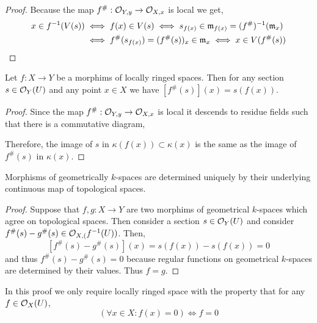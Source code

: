 \documentclass[12pt]{article}
\begin{document}
\begin{proof}
Because the map $f^\# : \mathcal{O}_{Y, y} \to \mathcal{O}_{X, x}$ is local we get,
\begin{align*}
x \in f^{-1}(V(s)) & \iff f(x) \in V(s) \iff s_{f(x)} \in \mathfrak{m}_{f(x)} = (f^\#)^{-1}(\mathfrak{m}_x) 
\\
& \iff f^\#(s_{f(x)}) = (f^{\#}(s))_x \in \mathfrak{m}_x \iff x \in V(f^{\#}(s))
\end{align*}
\end{proof}

\begin{lemma}
Let $f : X \to Y$ be a morphims of locally ringed spaces. Then for any section $s \in \mathcal{O}_{Y}(U)$ and any point $x \in X$ we have $[f^\#(s)](x) = s(f(x))$. 
\end{lemma}

\begin{proof}
Since the map $f^\# : \mathcal{O}_{Y, y} \to \mathcal{O}_{X, x}$ is local it descends to residue fields such that there is a commutative diagram,
\begin{center}
\end{center}
Therefore, the image of $s$ in $\kappa(f(x)) \subset \kappa(x)$ is the same as the image of $f^\#(s)$ in $\kappa(x)$.
\end{proof}

\begin{prop}
Morphisms of geometrically $k$-spaces are determined uniquely by their underlying continuous map of topological spaces.
\end{prop}

\begin{proof}
Suppose that $f, g : X \to Y$ are two morphims of geometrical $k$-spaces which agree on topological spaces. Then consider a section $s \in \mathcal{O}_{Y}(U)$ and consider $f^\#(s) - g^\#(s) \in \mathcal{O}_{X, (}f^{-1}(U))$. Then,
\[ [f^\#(s) - g^\#(s)](x) = s(f(x)) - s(f(x)) = 0 \]
and thus $f^\#(s) - g^\#(s) = 0$ because regular functions on geometrical $k$-spaces are determined by their values. Thus $f = g$.
\end{proof}

\begin{rmk}
In this proof we only require locally ringed space with the property that for any $f \in \mathcal{O}_{X}(U)$,
\[ (\forall x \in X : f(x) = 0) \iff f = 0 \] 
\end{rmk}
\end{document}
